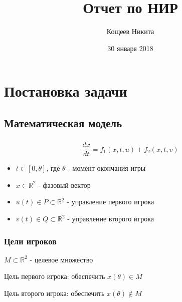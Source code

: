 \documentclass{beamer}
\title[Отчет по НИР]{Отчет по НИР}
\author{Кощеев Никита}
\institute[УрФУ]{Институт естественных наук и математики}
\date{30 января 2018}
\newcommand{\dimension}{\mathbb{R}^2}
\begin{document}
  
  \begin{frame}
      
    \titlepage 
    
  \end{frame}
  
  
  
  \section{Постановка задачи} 
  
  \subsection{Математическая модель} 
  
  \begin{frame}
    \frametitle{\subsecname}
    
    \begin{equation}
      \frac{dx}{dt} = f_1(x,t,u) + f_2(x,t,v)
    \end{equation}
  
    \begin{itemize}
      \item $t \in [0,\theta]$, где $\theta$ - момент окончания игры
      \item $x \in \dimension$ - фазовый вектор
      \item $u(t) \in P \subset \dimension$ - управление первого игрока
      \item $v(t) \in Q \subset \dimension$ - управление второго игрока
    \end{itemize}
  \end{frame}
  
   
  \begin{frame}
    \frametitle{Цели игроков}
  
    $M \subset \dimension$ - целевое множество 
    \vspace{5mm}
  
    Цель первого игрока: обеспечить $x(\theta) \in M$

    Цель второго игрока: обеспечить $x(\theta) \notin M$

  \end{frame}
  
\end{document}
